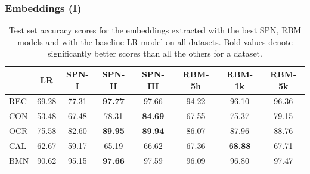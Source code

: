 \documentclass[10pt, t, xcolor={usenames,dvipsnames,svgnames}, compress]{beamer}
\begin{document}
\begin{frame}
  \frametitle{Embeddings (I)}
  \begin{table}[!t]
    \centering
    \footnotesize
    \caption[datasets]{Test set accuracy scores for the embeddings
      extracted with the best \textsf{SPN},
      \textsf{RBM} models and with the baseline \textsf{LR} model on all
      datasets. Bold values denote significantly better scores
      than all the others for a dataset.}
    \setlength{\tabcolsep}{3pt}  
    \begin{tabular}{l c c c c c c c}
      \toprule
      
      & \textsf{LR} & \textsf{SPN-I} & \textsf{SPN-II} & \textsf{SPN-III} & \textsf{RBM-5h} & \textsf{RBM-1k} & \textsf{RBM-5k} \\
      \midrule
      \textsf{REC} & 69.28 & 77.31& \textbf{97.77}& 97.66& 94.22& 96.10& 96.36\\
      \midrule
      \textsf{CON} & 53.48 & 67.48& 78.31& \textbf{84.69}& 67.55& 75.37& 79.15\\
      \midrule
      \textsf{OCR} & 75.58 & 82.60& \textbf{89.95}& \textbf{89.94}& 86.07& 87.96& 88.76\\
      \midrule
      \textsf{CAL} & 62.67& 59.17 & 65.19& 66.62& 67.36& \textbf{68.88}& 67.71\\
      \midrule
      \textsf{BMN} & 90.62& 95.15& \textbf{97.66}& 97.59& 96.09& 96.80& 97.47\\
      \bottomrule
    \end{tabular}
    \label{tab:model-accs}
  \end{table}
\end{frame}
\end{document}
